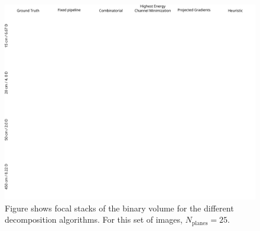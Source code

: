 \begin{figure}[!htb]
\centering
\includegraphics[width=0.99\columnwidth]{images/volumetric/acd_exp9/exp_FS}
\caption[Volumetric NED: Adaptive decomposition results: Focal stacks for transparent objects and $N_{\text{planes}}=25$]{Figure shows focal stacks of the binary volume for the different decomposition algorithms. For this set of images, $N_{\text{planes}}=25$.}
\label{fig:volumetric:acd:exp9:focalstack}
\end{figure}

